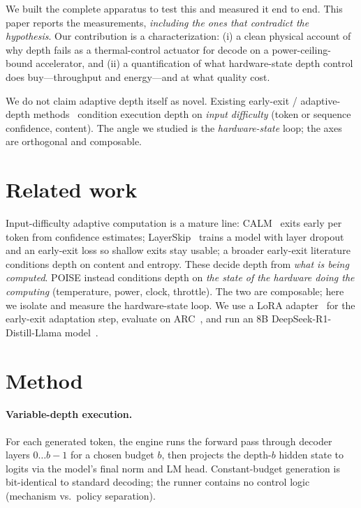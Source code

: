 \documentclass[11pt]{article}
\begin{document}
We built the complete apparatus to test this and measured it end to end. This paper reports the
measurements, \emph{including the ones that contradict the hypothesis}. Our contribution is a
characterization: (i) a clean physical account of why depth fails as a thermal-control actuator
for decode on a power-ceiling-bound accelerator, and (ii) a quantification of what
hardware-state depth control does buy---throughput and energy---and at what quality cost.

We do not claim adaptive depth itself as novel. Existing early-exit / adaptive-depth
methods~\cite{calm,layerskip} condition execution depth on \emph{input difficulty} (token or
sequence confidence, content). The angle we studied is the \emph{hardware-state} loop; the axes
are orthogonal and composable.

\section{Related work}
Input-difficulty adaptive computation is a mature line: CALM~\cite{calm} exits early per token
from confidence estimates; LayerSkip~\cite{layerskip} trains a model with layer dropout and an
early-exit loss so shallow exits stay usable; a broader early-exit literature conditions depth on
content and entropy. These decide depth from \emph{what is being computed}. POISE instead
conditions depth on \emph{the state of the hardware doing the computing} (temperature, power,
clock, throttle). The two are composable; here we isolate and measure the hardware-state loop.
We use a LoRA adapter~\cite{lora} for the early-exit adaptation step, evaluate on
ARC~\cite{arc}, and run an 8B DeepSeek-R1-Distill-Llama model~\cite{deepseekr1}.

\section{Method}
\paragraph{Variable-depth execution.} For each generated token, the engine runs the forward pass
through decoder layers $0\ldots b{-}1$ for a chosen budget $b$, then projects the depth-$b$
hidden state to logits via the model's final norm and LM head. Constant-budget generation is
bit-identical to standard decoding; the runner contains no control logic (mechanism vs.\ policy
separation).
\end{document}
